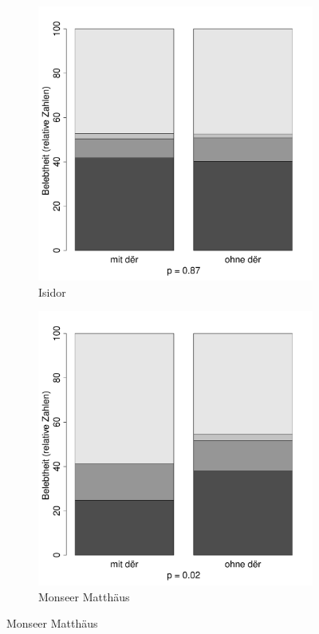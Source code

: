 \begin{figure}
\begin{subfigure}[b]{.5\linewidth}
  \includegraphics[height=.25\textheight]{generated/images/belebtheit-I}
\caption {Isidor}
\end{subfigure}%
\begin{subfigure}[b]{.5\linewidth}
  \includegraphics[height=.25\textheight]{generated/images/belebtheit-M}
\caption {Monseer Matthäus}
\end{subfigure}


\end{figure}
